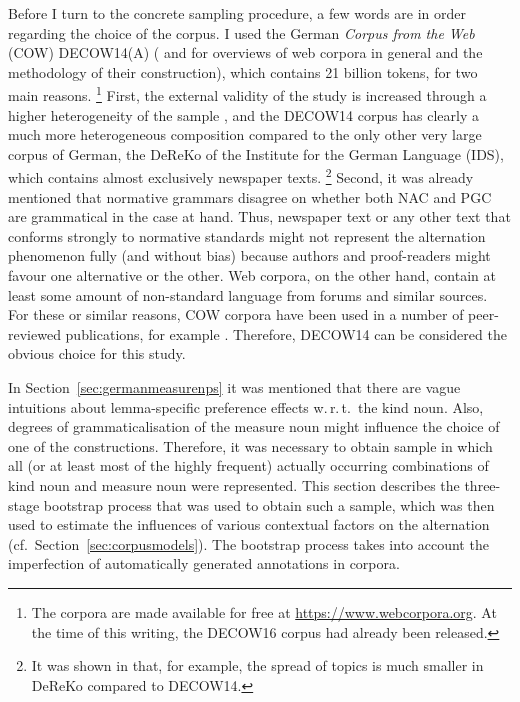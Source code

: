 \documentclass[USenglish]{article}
\begin{document}

Before I turn to the concrete sampling procedure, a few words are in order regarding the choice of the corpus.
I used the German \textit{Corpus from the Web} (COW) DECOW14(A) (\citealp{SchaeferBildhauer2012full,Schaefer2015b} and \citealp{BiemannEa2013,SchaeferBildhauer2013} for overviews of web corpora in general and the methodology of their construction), which contains 21 billion tokens, for two main reasons.%
\footnote{The corpora are made available for free at \url{https://www.webcorpora.org}.
At the time of this writing, the DECOW16 corpus had already been released.}
First, the external validity of the study is increased through a higher heterogeneity of the sample \citep[30]{MaxwellDelaney2004}, and the DECOW14 corpus has clearly a much more heterogeneous composition compared to the only other very large corpus of German, the DeReKo \citep{KupietzEa2010} of the Institute for the German Language (IDS), which contains almost exclusively newspaper texts.%
\footnote{It was shown in \cite{W16-2601} that, for example, the spread of topics is much smaller in DeReKo compared to DECOW14.}
Second, it was already mentioned that normative grammars disagree on whether both NAC and PGC are grammatical in the case at hand.
Thus, newspaper text or any other text that conforms strongly to normative standards might not represent the alternation phenomenon fully (and without bias) because authors and proof-readers might favour one alternative or the other.
Web corpora, on the other hand, contain at least some amount of non-standard language from forums and similar sources.
For these or similar reasons, COW corpora have been used in a number of peer-reviewed publications, for example \cite{VanGoethemHiligsmann2014,VanGoethemHuening2015,MuellerS2014,Schaefer2016c,SchaeferSayatz2014,SchaeferSayatz2016,StefanowitschFlach2016,Zimmer2015}. 
Therefore, DECOW14 can be considered the obvious choice for this study.

In Section~\ref{sec:germanmeasurenps} it was mentioned that there are vague intuitions about lemma-specific preference effects w.\,r.\,t.\ the kind noun.
Also, degrees of grammaticalisation of the measure noun might influence the choice of one of the constructions.
Therefore, it was necessary to obtain sample in which all (or at least most of the highly frequent) actually occurring combinations of kind noun and measure noun were represented.
This section describes the three-stage bootstrap process that was used to obtain such a sample, which was then used to estimate the influences of various contextual factors on the alternation (cf.\ Section~\ref{sec:corpusmodels}).
The bootstrap process takes into account the imperfection of automatically generated annotations in corpora.
\end{document}
